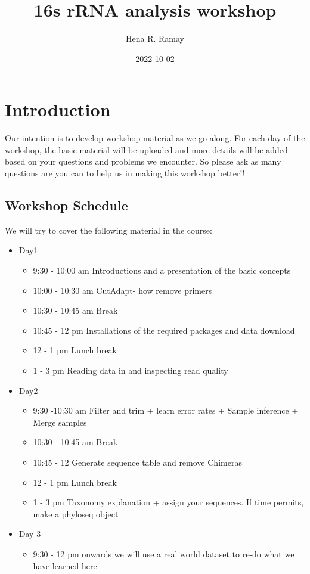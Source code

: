 \documentclass[
]{book}
\title{16s rRNA analysis workshop}
\author{Hena R. Ramay}
\date{2022-10-02}
\providecommand{\tightlist}{%
  \setlength{\itemsep}{0pt}\setlength{\parskip}{0pt}}
\begin{document}
\maketitle

{
\setcounter{tocdepth}{1}
\tableofcontents
}
\hypertarget{introduction}{%
\chapter{Introduction}\label{introduction}}

Our intention is to develop workshop material as we go along. For each day of the workshop, the basic material will be uploaded and more details will be added based on your questions and problems we encounter. So please ask as many questions are you can to help us in making this workshop better!!

\hypertarget{workshop-schedule}{%
\section{Workshop Schedule}\label{workshop-schedule}}

We will try to cover the following material in the course:

\begin{itemize}
\tightlist
\item
  Day1

  \begin{itemize}
  \tightlist
  \item
    9:30 - 10:00 am Introductions and a presentation of the basic concepts
  \item
    10:00 - 10:30 am CutAdapt- how remove primers
  \item
    10:30 - 10:45 am Break
  \item
    10:45 - 12 pm Installations of the required packages and data download
  \item
    12 - 1 pm Lunch break
  \item
    1 - 3 pm Reading data in and inspecting read quality
  \end{itemize}
\item
  Day2

  \begin{itemize}
  \tightlist
  \item
    9:30 -10:30 am Filter and trim + learn error rates + Sample inference + Merge samples
  \item
    10:30 - 10:45 am Break
  \item
    10:45 - 12 Generate sequence table and remove Chimeras
  \item
    12 - 1 pm Lunch break
  \item
    1 - 3 pm Taxonomy explanation + assign your sequences. If time permits, make a phyloseq object
  \end{itemize}
\item
  Day 3

  \begin{itemize}
  \tightlist
  \item
    9:30 - 12 pm onwards we will use a real world dataset to re-do what we have learned here
  \end{itemize}
\end{itemize}
\end{document}
